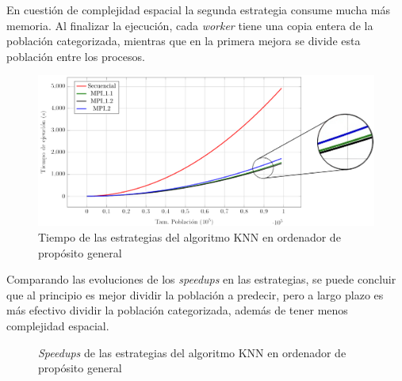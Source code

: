 			En cuestión de complejidad espacial la segunda estrategia consume mucha más memoria. Al finalizar la ejecución, cada \textit{worker} tiene una copia entera de la población categorizada, mientras que en la primera mejora se divide esta población entre los procesos. 
			

			\begin{figure}[!h]
				\centering
				\includegraphics[width=1\textwidth]{images/chapter_4/knn_mpi}
				\caption{Tiempo de las estrategias del algoritmo KNN en ordenador de propósito general}
				\label{fig:knn_ordenador}
			\end{figure}
			
			
			Comparando las evoluciones de los \textit{speedups} en las estrategias, se puede concluir que al principio es mejor dividir la población a predecir, pero a largo plazo es más efectivo dividir la población categorizada, además de tener menos complejidad espacial. 
		
			\begin{figure} [!h]
				\centering
				\caption{\textit{Speedups} de las estrategias del algoritmo KNN en ordenador de propósito general}
			\end{figure}
			
